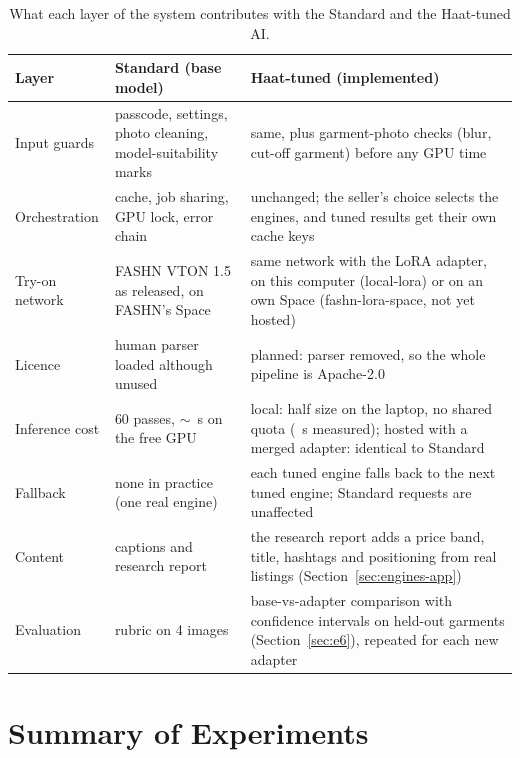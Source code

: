 \begin{table}[!htbp]
\centering
\caption{What each layer of the system contributes with the Standard and the Haat-tuned AI.}
\label{tab:layers-after}
\small
\begin{tabularx}{\linewidth}{@{}L{30mm}YY@{}}
\toprule
\textbf{Layer} & \textbf{Standard (base model)} & \textbf{Haat-tuned (implemented)}\\
\midrule
Input guards & passcode, settings, photo cleaning, model-suitability marks & same, plus garment-photo checks (blur, cut-off garment) before any GPU time\\
Orchestration & cache, job sharing, GPU lock, error chain & unchanged; the seller's choice selects the engines, and tuned results get their own cache keys\\
Try-on network & FASHN VTON 1.5 as released, on FASHN's Space & same network with the LoRA adapter, on this computer (local-lora) or on an own Space (fashn-lora-space, not yet hosted)\\
Licence & human parser loaded although unused & planned: parser removed, so the whole pipeline is Apache-2.0\\
Inference cost & 60 passes, $\sim$\vMedTotal{}~s on the free GPU & local: half size on the laptop, no shared quota\ifTuned{} (\vTunedSec{}~s measured)\fi; hosted with a merged adapter: identical to Standard\\
Fallback & none in practice (one real engine) & each tuned engine falls back to the next tuned engine; Standard requests are unaffected\\
Content & captions and research report & the research report adds a price band, title, hashtags and positioning from real listings (Section~\ref{sec:engines-app})\\
Evaluation & rubric on 4 images & base-vs-adapter comparison with confidence intervals on held-out garments (Section~\ref{sec:e6}), repeated for each new adapter\\
\bottomrule
\end{tabularx}
\end{table}

\section{Summary of Experiments}

